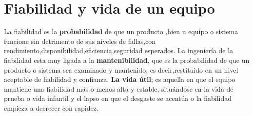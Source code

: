 \documentclass[
	12pt, %
	fleqn, %
	a4paper, %
]{LegrandOrangeBook}
\begin{document}
\section{Fiabilidad y vida de un equipo}
La fiabilidad es la \textbf{probabilidad} de que un producto ,bien u equipo o sistema funcione sin detrimento de sus niveles de fallas,con rendimiento,disponibilidad,eficiencia,seguridad esperados. La ingeniería de la fiabilidad esta muy ligada a la \textbf{mantenibilidad}, que es la probabilidad de que un producto o sistema sea examinado y mantenido, es decir,restituido en un nivel aceptable de fiabilidad y confianza. \textbf{La vida útil}; es aquella en que el equipo mantiene una fiabilidad más o menos alta y estable, situándose en la vida de prueba o vida infantil y el lapso en que el desgaste se acentúa o la fiabilidad empieza a decrecer con rapidez.
\end{document}
